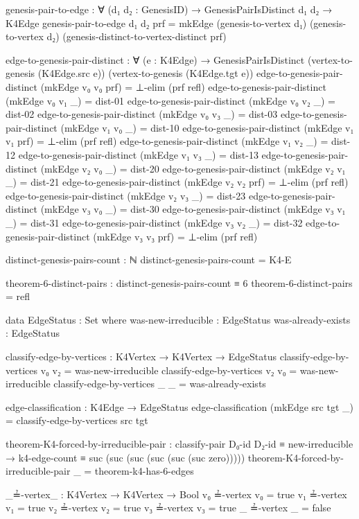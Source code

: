 \documentclass[11pt,a4paper]{book}
\begin{document}
\begin{code}
genesis-pair-to-edge : ∀ (d₁ d₂ : GenesisID) → GenesisPairIsDistinct d₁ d₂ → K4Edge
genesis-pair-to-edge d₁ d₂ prf = 
  mkEdge (genesis-to-vertex d₁) (genesis-to-vertex d₂) (genesis-distinct-to-vertex-distinct prf)

edge-to-genesis-pair-distinct : ∀ (e : K4Edge) → 
  GenesisPairIsDistinct (vertex-to-genesis (K4Edge.src e)) (vertex-to-genesis (K4Edge.tgt e))
edge-to-genesis-pair-distinct (mkEdge v₀ v₀ prf) = ⊥-elim (prf refl)
edge-to-genesis-pair-distinct (mkEdge v₀ v₁ _) = dist-01
edge-to-genesis-pair-distinct (mkEdge v₀ v₂ _) = dist-02
edge-to-genesis-pair-distinct (mkEdge v₀ v₃ _) = dist-03
edge-to-genesis-pair-distinct (mkEdge v₁ v₀ _) = dist-10
edge-to-genesis-pair-distinct (mkEdge v₁ v₁ prf) = ⊥-elim (prf refl)
edge-to-genesis-pair-distinct (mkEdge v₁ v₂ _) = dist-12
edge-to-genesis-pair-distinct (mkEdge v₁ v₃ _) = dist-13
edge-to-genesis-pair-distinct (mkEdge v₂ v₀ _) = dist-20
edge-to-genesis-pair-distinct (mkEdge v₂ v₁ _) = dist-21
edge-to-genesis-pair-distinct (mkEdge v₂ v₂ prf) = ⊥-elim (prf refl)
edge-to-genesis-pair-distinct (mkEdge v₂ v₃ _) = dist-23
edge-to-genesis-pair-distinct (mkEdge v₃ v₀ _) = dist-30
edge-to-genesis-pair-distinct (mkEdge v₃ v₁ _) = dist-31
edge-to-genesis-pair-distinct (mkEdge v₃ v₂ _) = dist-32
edge-to-genesis-pair-distinct (mkEdge v₃ v₃ prf) = ⊥-elim (prf refl)

distinct-genesis-pairs-count : ℕ
distinct-genesis-pairs-count = K4-E

theorem-6-distinct-pairs : distinct-genesis-pairs-count ≡ 6
theorem-6-distinct-pairs = refl

data EdgeStatus : Set where
  was-new-irreducible : EdgeStatus
  was-already-exists  : EdgeStatus

classify-edge-by-vertices : K4Vertex → K4Vertex → EdgeStatus
classify-edge-by-vertices v₀ v₂ = was-new-irreducible
classify-edge-by-vertices v₂ v₀ = was-new-irreducible
classify-edge-by-vertices _ _ = was-already-exists

edge-classification : K4Edge → EdgeStatus
edge-classification (mkEdge src tgt _) = classify-edge-by-vertices src tgt

theorem-K4-forced-by-irreducible-pair : 
  classify-pair D₀-id D₂-id ≡ new-irreducible →
  k4-edge-count ≡ suc (suc (suc (suc (suc (suc zero)))))
theorem-K4-forced-by-irreducible-pair _ = theorem-k4-has-6-edges

_≟-vertex_ : K4Vertex → K4Vertex → Bool
v₀ ≟-vertex v₀ = true
v₁ ≟-vertex v₁ = true
v₂ ≟-vertex v₂ = true
v₃ ≟-vertex v₃ = true
_  ≟-vertex _  = false


\end{code}
\end{document}
